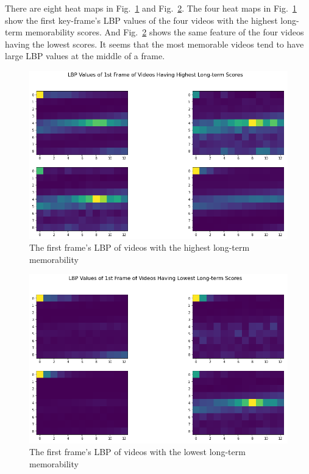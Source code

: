 \documentclass[conference, compsoc]{IEEEtran}
\begin{document}
{There are eight heat maps in Fig.~\ref{fig:high-long-memo-lbp} and Fig.~\ref{fig:low-long-memo-lbp}.
The four heat maps in Fig.~\ref{fig:high-long-memo-lbp} show the first key-frame's LBP values of the four videos with the highest long-term memorability scores.
And Fig.~\ref{fig:low-long-memo-lbp} shows the same feature of the four videos having the lowest scores.
It seems that the most memorable videos tend to have large LBP values at the middle of a frame.

\begin{figure}[htbp]
    \centerline{\includegraphics[width=\linewidth]{figures/high-long-memo-lbp.png}}
    \caption{The first frame's LBP of videos with the highest long-term memorability}
    \label{fig:high-long-memo-lbp}
\end{figure}

\begin{figure}[htbp]
    \centerline{\includegraphics[width=\linewidth]{figures/low-long-memo-lbp.png}}
    \caption{The first frame's LBP of videos with the lowest long-term memorability}
    \label{fig:low-long-memo-lbp}
\end{figure}

}
\end{document}
